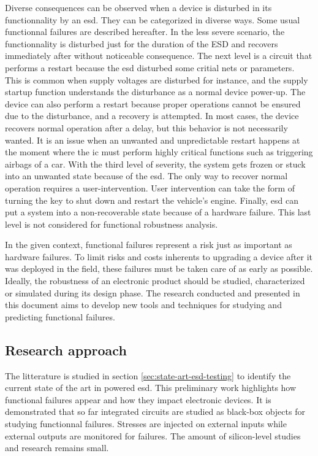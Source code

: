 Diverse consequences can be observed when a device is disturbed in its functionnality by an \gls{esd}.
They can be categorized in diverse ways.
Some usual functionnal failures are described hereafter.
In the less severe scenario, the functionnality is disturbed just for the duration of the ESD and recovers immediately after without noticeable consequence.
The next level is a circuit that performs a restart because the \gls{esd} disturbed some critial nets or parameters.
This is common when supply voltages are disturbed for instance, and the supply startup function understands the disturbance as a normal device power-up.
The device can also perform a restart because proper operations cannot be ensured due to the disturbance, and a recovery is attempted.
In most cases, the device recovers normal operation after a delay, but this behavior is not necessarily wanted.
It is an issue when an unwanted and unpredictable restart happens at the moment where the \gls{ic} must perform highly critical functions such as triggering airbags of a car.
With the third level of severity, the system gets frozen or stuck into an unwanted state because of the \gls{esd}.
The only way to recover normal operation requires a user-intervention.
User intervention can take the form of turning the key to shut down and restart the vehicle's engine.
Finally, \gls{esd} can put a system into a non-recoverable state because of a hardware failure.
This last level is not considered for functional robustness analysis.


In the given context, functional failures represent a risk just as important as hardware failures.
To limit risks and costs inherents to upgrading a device after it was deployed in the field, these failures must be taken care of as early as possible.
Ideally, the robustness of an electronic product should be studied, characterized or simulated during its design phase.
The research conducted and presented in this document aims to develop new tools and techniques for studying and predicting functional failures.

\subsection{Research approach}

The litterature is studied in section \ref{sec:state-art-esd-testing} to identify the current state of the art in powered \gls{esd}.
This preliminary work highlights how functional failures appear and how they impact electronic devices.
It is demonstrated that so far integrated circuits are studied as black-box objects for studying functionnal failures.
Stresses are injected on external inputs while external outputs are monitored for failures.
The amount of silicon-level studies and research remains small.

